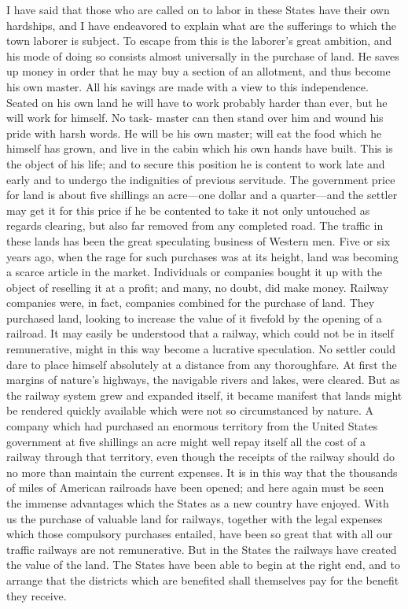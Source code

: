 I have said that those who are called on to labor in these States
have their own hardships, and I have endeavored to explain what are
the sufferings to which the town laborer is subject.  To escape
from this is the laborer's great ambition, and his mode of doing so
consists almost universally in the purchase of land.  He saves up
money in order that he may buy a section of an allotment, and thus
become his own master.  All his savings are made with a view to
this independence.  Seated on his own land he will have to work
probably harder than ever, but he will work for himself.  No task-
master can then stand over him and wound his pride with harsh
words.  He will be his own master; will eat the food which he
himself has grown, and live in the cabin which his own hands have
built.  This is the object of his life; and to secure this position
he is content to work late and early and to undergo the indignities
of previous servitude.  The government price for land is about five
shillings an acre---one dollar and a quarter---and the settler may
get it for this price if he be contented to take it not only
untouched as regards clearing, but also far removed from any
completed road.  The traffic in these lands has been the great
speculating business of Western men.  Five or six years ago, when
the rage for such purchases was at its height, land was becoming a
scarce article in the market.  Individuals or companies bought it
up with the object of reselling it at a profit; and many, no doubt,
did make money.  Railway companies were, in fact, companies
combined for the purchase of land.  They purchased land, looking to
increase the value of it fivefold by the opening of a railroad.  It
may easily be understood that a railway, which could not be in
itself remunerative, might in this way become a lucrative
speculation.  No settler could dare to place himself absolutely at
a distance from any thoroughfare.  At first the margins of nature's
highways, the navigable rivers and lakes, were cleared.  But as the
railway system grew and expanded itself, it became manifest that
lands might be rendered quickly available which were not so
circumstanced by nature.  A company which had purchased an enormous
territory from the United States government at five shillings an
acre might well repay itself all the cost of a railway through that
territory, even though the receipts of the railway should do no
more than maintain the current expenses.  It is in this way that
the thousands of miles of American railroads have been opened; and
here again must be seen the immense advantages which the States as
a new country have enjoyed.  With us the purchase of valuable land
for railways, together with the legal expenses which those
compulsory purchases entailed, have been so great that with all our
traffic railways are not remunerative.  But in the States the
railways have created the value of the land.  The States have been
able to begin at the right end, and to arrange that the districts
which are benefited shall themselves pay for the benefit they
receive.

